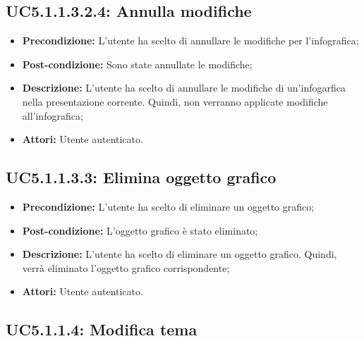 \subsection{ UC5.1.1.3.2.4: Annulla modifiche}

\begin{itemize}
	\item \textbf{Precondizione:} L'utente ha scelto di annullare le modifiche per l'infografica;
	\item \textbf{Post-condizione:} Sono state annullate le modifiche;
	\item \textbf{Descrizione:} L'utente ha scelto di annullare le modifiche di un'infogarfica nella presentazione corrente. Quindi, non verranno applicate modifiche all'infografica;
	\item \textbf{Attori:} Utente autenticato.
\end{itemize}
\subsection{ UC5.1.1.3.3: Elimina oggetto grafico}

\begin{itemize}
	\item \textbf{Precondizione:} L'utente ha scelto di eliminare un oggetto grafico;
	\item \textbf{Post-condizione:} L'oggetto grafico è stato eliminato;
	\item \textbf{Descrizione:} L'utente ha scelto di eliminare un oggetto grafico. Quindi, verrà eliminato l'oggetto grafico corrispondente;
	\item \textbf{Attori:} Utente autenticato.
\end{itemize}
\subsection{ UC5.1.1.4: Modifica tema}

